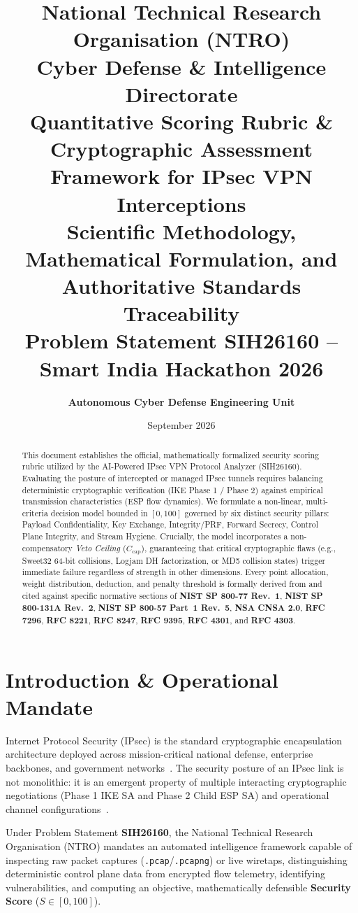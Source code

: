 \documentclass[11pt,a4paper]{article}
\title{
    \vspace{-1.5cm}
    \textbf{\Large National Technical Research Organisation (NTRO)}\\
    \textbf{\large Cyber Defense \& Intelligence Directorate}\\
    \vspace{0.4cm}
    \textbf{\LARGE Quantitative Scoring Rubric \& Cryptographic Assessment Framework for IPsec VPN Interceptions}\\
    \vspace{0.2cm}
    \normalsize Scientific Methodology, Mathematical Formulation, and Authoritative Standards Traceability\\
    \small Problem Statement SIH26160 -- Smart India Hackathon 2026
}
\author{\textbf{Autonomous Cyber Defense Engineering Unit}}
\date{September 2026}
\begin{document}
\maketitle
\thispagestyle{fancy}

\begin{abstract}
This document establishes the official, mathematically formalized security scoring rubric utilized by the AI-Powered IPsec VPN Protocol Analyzer (SIH26160). Evaluating the posture of intercepted or managed IPsec tunnels requires balancing deterministic cryptographic verification (IKE Phase 1 / Phase 2) against empirical transmission characteristics (ESP flow dynamics). We formulate a non-linear, multi-criteria decision model bounded in $[0, 100]$ governed by six distinct security pillars: Payload Confidentiality, Key Exchange, Integrity/PRF, Forward Secrecy, Control Plane Integrity, and Stream Hygiene. Crucially, the model incorporates a non-compensatory \textit{Veto Ceiling} ($C_{\text{cap}}$), guaranteeing that critical cryptographic flaws (e.g., Sweet32 64-bit collisions, Logjam DH factorization, or MD5 collision states) trigger immediate failure regardless of strength in other dimensions. Every point allocation, weight distribution, deduction, and penalty threshold is formally derived from and cited against specific normative sections of \textbf{NIST SP 800-77 Rev.~1}, \textbf{NIST SP 800-131A Rev.~2}, \textbf{NIST SP 800-57 Part~1 Rev.~5}, \textbf{NSA CNSA 2.0}, \textbf{RFC 7296}, \textbf{RFC 8221}, \textbf{RFC 8247}, \textbf{RFC 9395}, \textbf{RFC 4301}, and \textbf{RFC 4303}.
\end{abstract}

\vspace{0.3cm}

\section{Introduction \& Operational Mandate}
Internet Protocol Security (IPsec) is the standard cryptographic encapsulation architecture deployed across mission-critical national defense, enterprise backbones, and government networks~\cite{rfc4301, nist800-77r1}. The security posture of an IPsec link is not monolithic: it is an emergent property of multiple interacting cryptographic negotiations (Phase 1 IKE SA and Phase 2 Child ESP SA) and operational channel configurations~\cite{rfc7296, rfc4303}.

Under Problem Statement \textbf{SIH26160}, the National Technical Research Organisation (NTRO) mandates an automated intelligence framework capable of inspecting raw packet captures (\texttt{.pcap}/\texttt{.pcapng}) or live wiretaps, distinguishing deterministic control plane data from encrypted flow telemetry, identifying vulnerabilities, and computing an objective, mathematically defensible \textbf{Security Score} ($S \in [0, 100]$).
\end{document}
